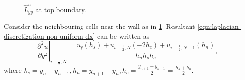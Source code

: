 \documentclass{article}
\numberwithin{equation}{section}
\begin{document}
\begin{figure}[h]
  \caption{$\hat{L}^u_{yy}$ at top boundary.}\label{fig:luxx-top}
\end{figure}

Consider the neighbouring cells near the wall as in \cref{fig:luxx-top}. Resultant \cref{eqn:laplacian-discretization-non-uniform-dx}  can be written as
\begin{equation}\label{eqn:laplacian-discretization-non-uniform-dy}
\left.\frac{\partial^2 u}{\partial y^2}\right|_{i-\frac{1}{2},N}=\frac{u_g\left(h_s\right)+u_{i-\frac{1}{2},N}\left(-2 h_c\right)+u_{i-\frac{1}{2},N-1}\left(h_n\right)}{h_n h_s h_c},
\end{equation}
where $h_s=y_{n}-y_{n-1}, h_n = y_{n+1}-y_n, h_c = \frac{y_{n+1}-y_{n-1}}{2}=\frac{h_s+h_n}{2}$.
\end{document}
